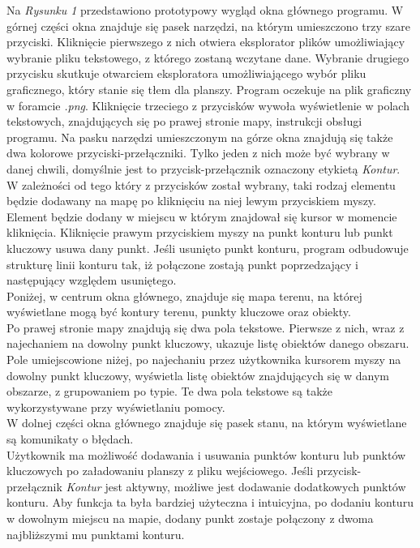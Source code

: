 \documentclass[a4paper,12pt]{article}
\newcommand\tab[1][0.6cm]{\hspace*{#1} }
\begin{document}
\tab Na \textit{Rysunku 1} przedstawiono prototypowy wygląd okna głównego programu. W górnej części okna znajduje się pasek narzędzi, na którym umieszczono trzy szare przyciski. Kliknięcie pierwszego z nich otwiera eksplorator plików umożliwiający wybranie pliku tekstowego, z którego zostaną wczytane dane. Wybranie drugiego przycisku skutkuje otwarciem eksploratora umożliwiającego wybór pliku graficznego, który stanie się tłem dla planszy. Program oczekuje na plik graficzny w foramcie \textit{.png}. Kliknięcie trzeciego z przycisków wywoła wyświetlenie w polach tekstowych, znajdujących się po prawej stronie mapy, instrukcji obsługi programu. Na pasku narzędzi umieszczonym na górze okna znajdują się także dwa kolorowe przyciski-przełączniki. Tylko jeden z nich może być wybrany w danej chwili, domyślnie jest to przycisk-przełącznik oznaczony etykietą \textit{Kontur}.
W zależności od tego który z przycisków został wybrany, taki rodzaj elementu będzie dodawany na mapę po kliknięciu na niej lewym przyciskiem myszy. Element będzie dodany w miejscu w którym znajdował się kursor w momencie kliknięcia. Kliknięcie prawym przyciskiem myszy na punkt konturu lub punkt kluczowy usuwa dany punkt. Jeśli usunięto punkt konturu, program odbudowuje strukturę linii konturu tak, iż połączone zostają punkt poprzedzający i następujący względem usuniętego.
\\\tab Poniżej, w centrum okna głównego, znajduje się mapa terenu, na której wyświetlane mogą być kontury terenu, punkty kluczowe oraz obiekty.
\\\tab Po prawej stronie mapy znajdują się dwa pola tekstowe. Pierwsze z nich, wraz z najechaniem na dowolny punkt kluczowy, ukazuje listę obiektów danego obszaru. Pole umiejscowione niżej, po najechaniu przez użytkownika kursorem myszy na dowolny punkt kluczowy, wyświetla listę obiektów znajdujących się w danym obszarze, z grupowaniem po typie. Te dwa pola tekstowe są także wykorzystywane przy wyświetlaniu pomocy.
\\\tab W dolnej części okna głównego znajduje się pasek stanu, na którym wyświetlane są komunikaty o błędach.
\\\tab Użytkownik ma możliwość dodawania i usuwania punktów konturu lub punktów kluczowych po załadowaniu planszy z pliku wejściowego. Jeśli przycisk-przełącznik \textit{Kontur} jest aktywny, możliwe jest dodawanie dodatkowych punktów konturu. Aby funkcja ta była bardziej użyteczna i intuicyjna, po dodaniu konturu w dowolnym miejscu na mapie, dodany punkt zostaje połączony z dwoma najbliższymi mu punktami konturu.
\end{document}
